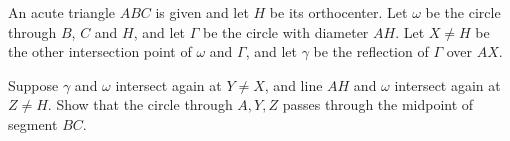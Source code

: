 An acute triangle $ABC$ is given and let $H$ be its orthocenter. Let $\omega$ be the circle through $B$, $C$ and $H$, and let $\Gamma$ be the circle with diameter $AH$. Let $X\neq H$ be the other intersection point of $\omega$ and $\Gamma$, and let $\gamma$ be the reflection of $\Gamma$ over $AX$.

Suppose $\gamma$ and $\omega$ intersect again at $Y\neq X$, and line $AH$ and $\omega$ intersect again at $Z \neq H$. Show that the circle through $A,Y,Z$ passes through the midpoint of segment $BC$.